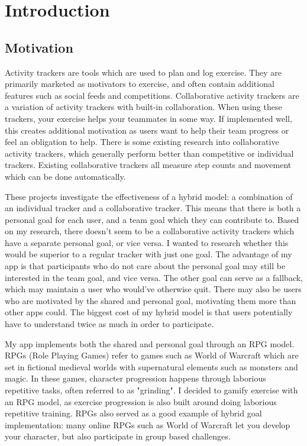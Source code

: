 \documentclass{l4proj}
\begin{document}
\chapter{Introduction}

\section{Motivation}

Activity trackers are tools which are used to plan and log exercise. They are primarily marketed as motivators to exercise, and often contain additional features such as social feeds and competitions. Collaborative activity trackers are a variation of activity trackers with built-in collaboration. When using these trackers, your exercise helps your teammates in some way. If implemented well, this creates additional motivation as users want to help their team progress or feel an obligation to help. There is some existing research into collaborative activity trackers, which generally perform better than competitive or individual trackers. Existing collaborative trackers all measure step counts and movement which can be done automatically. 

These projects investigate the effectiveness of a hybrid model: a combination of an individual tracker and a collaborative tracker. This means that there is both a personal goal for each user, and a team goal which they can contribute to. Based on my research, there doesn't seem to be a collaborative activity trackers which have a separate personal goal, or vice versa. I wanted to research whether this would be superior to a regular tracker with just one goal. The advantage of my app is that participants who do not care about the personal goal may still be interested in the team goal, and vice versa. The other goal can serve as a fallback, which may maintain a user who would've otherwise quit. There may also be users who are motivated by the shared and personal goal, motivating them more than other apps could. The biggest cost of my hybrid model is that users potentially have to understand twice as much in order to participate. 

My app implements both the shared and personal goal through an RPG model. RPGs (Role Playing Games) refer to games such as World of Warcraft which are set in fictional medieval worlds with supernatural elements such as monsters and magic. In these games, character progression happens through laborious repetitive tasks, often referred to as "grinding". I decided to gamify exercise with an RPG model, as exercise progression is also built around doing laborious repetitive training. RPGs also served as a good example of hybrid goal implementation: many online RPGs such as World of Warcraft let you develop your character, but also participate in group based challenges.
\end{document}
